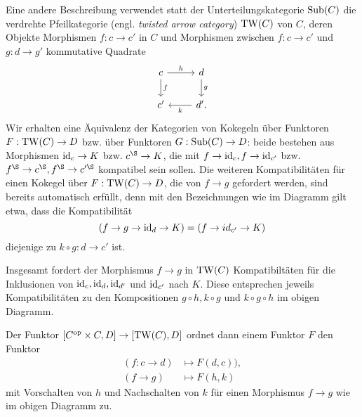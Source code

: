 \begin{bem}
  Eine andere Beschreibung verwendet statt der Unterteilungskategorie
  $\operatorname{Sub}(C)$ die verdrehte Pfeilkategorie (engl. \emph{twisted arrow
    category}) $\operatorname{TW}(C)$ von $C$, deren Objekte Morphismen $f: c \to
  c'$ in $C$ und Morphismen zwischen $f: c \to c'$ und $g: d \to g'$
  kommutative Quadrate
  \[ \begin{tikzcd}
    c \arrow{d}{f} \arrow{r}{h} & d \arrow{d}{g} \\
    c' & \arrow{l}{k} d'.
  \end{tikzcd} \]
  Wir erhalten eine Äquivalenz der Kategorien von Kokegeln über
  Funktoren $F: \operatorname{TW}(C) \to D$ bzw. über Funktoren $G: \operatorname{Sub}(C) \to D$:
  beide bestehen aus Morphismen $\operatorname{id}_c \to K$ bzw. $c^\S \to K$, die
  mit $f \to \operatorname{id}_c, f \to \operatorname{id}_{c'}$ bzw. $f^\S \to c^\S, f^\S \to
  c'^\S$ kompatibel sein sollen. Die weiteren Kompatibilitäten für
  einen Kokegel über $F: \operatorname{TW}(C) \to D$, die von $f \to g$ gefordert
  werden, sind bereits automatisch erfüllt, denn mit den Bezeichnungen
  wie im Diagramm gilt etwa, dass die Kompatibilität
  \[ (f \to g \to \operatorname{id}_d \to K) = (f \to id_{c'} \to K) \]
  diejenige zu $k \circ g: d \to c'$ ist.

  Insgesamt fordert der Morphismus $f \to g$ in $\operatorname{TW}(C)$
  Kompatibiltäten für die Inklusionen von $\operatorname{id}_c, \operatorname{id}_d, \operatorname{id}_{d'}$ und
  $\operatorname{id}_{c'}$ nach $K$. Diese entsprechen jeweils Kompatibilitäten zu
  den Kompositionen $g \circ h, k \circ g$ und $k \circ g \circ h$ im
  obigen Diagramm.

  Der Funktor $[C^\mathrm{op} \times C, D] \to [\operatorname{TW}(C), D]$ ordnet dann einem
  Funktor $F$ den Funktor
  \begin{align*}
    (f: c \to d) &\mapsto F(d, c)), \\
    (f \to g) &\mapsto F(h, k)
  \end{align*}
  mit Vorschalten von $h$ und Nachschalten von $k$ für einen
  Morphismus $f \to g$ wie im obigen Diagramm zu.
\end{bem}

